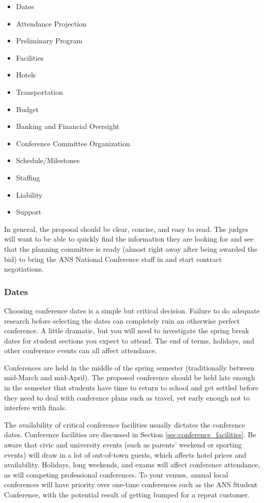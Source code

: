 \documentclass[12pt]{article}
\begin{document}
\begin{itemize}
\item{Dates}
\item{Attendance Projection}
\item{Preliminary Program}
\item{Facilities}
\item{Hotels}
\item{Transportation}
\item{Budget}
\item{Banking and Financial Oversight}
\item{Conference Committee Organization}
\item{Schedule/Milestones}
\item{Staffing}
\item{Liability}
\item{Support}
\end{itemize}

In general, the proposal should be clear, concise, and easy to read. The judges will want to be able to quickly find the information they are looking for and see that the planning committee is ready (almost right away after being awarded the bid) to bring the ANS National Conference staff in and start contract negotiations.

\subsubsection{Dates}
Choosing conference dates is a simple but critical decision. Failure to do adequate research before selecting the dates can completely ruin an otherwise perfect conference. A little dramatic, but you will need to investigate the spring break dates for student sections you expect to attend. The end of terms, holidays, and other conference events can all affect attendance.

Conferences are held in the middle of the spring semester (traditionally between mid-March and mid-April). The proposed conference should be held late enough in the semester that students have time to return to school and get settled before they need to deal with conference plans such as travel, yet early enough not to interfere with finals.

The availability of critical conference facilities usually dictates the conference dates. Conference facilities are discussed in Section \ref{sec:conference_facilities}. Be aware that civic and university events (such as parents’ weekend or sporting events) will draw in a lot of out-of-town guests, which affects hotel prices and availability. Holidays, long weekends, and exams will affect conference attendance, as will competing professional conferences. To your venues, annual local conferences will have priority over one-time conferences such as the ANS Student Conference, with the potential result of getting bumped for a repeat customer.
\end{document}
